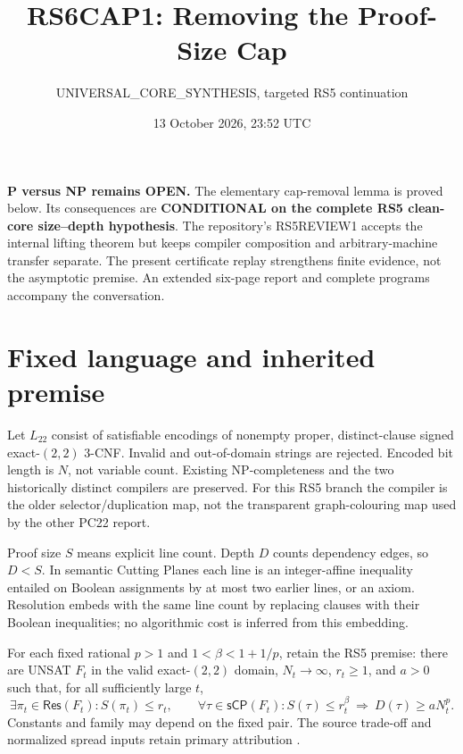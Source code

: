 \documentclass[11pt]{article}
\title{RS6CAP1: Removing the Proof-Size Cap}
\author{UNIVERSAL\_CORE\_SYNTHESIS, targeted RS5 continuation}
\date{13 October 2026, 23:52 UTC}
\newcommand{\sCP}{\mathsf{sCP}}
\begin{document}
\maketitle
\noindent\textbf{P versus NP remains OPEN.}
The elementary cap-removal lemma is proved below. Its consequences are
\textbf{CONDITIONAL on the complete RS5 clean-core size--depth hypothesis}.
The repository's RS5REVIEW1 accepts the internal lifting theorem but keeps
compiler composition and arbitrary-machine transfer separate. The present
certificate replay strengthens finite evidence, not the asymptotic premise.
An extended six-page report and complete programs accompany the conversation.

\section{Fixed language and inherited premise}
Let $L_{22}$ consist of satisfiable encodings of nonempty proper,
distinct-clause signed exact-$(2,2)$ 3-CNF. Invalid and out-of-domain strings
are rejected. Encoded bit length is $N$, not variable count. Existing
NP-completeness and the two historically distinct compilers are preserved.
For this RS5 branch the compiler is the older selector/duplication map,
not the transparent graph-colouring map used by the other PC22 report.

Proof size $S$ means explicit line count. Depth $D$ counts dependency edges,
so $D<S$. In semantic Cutting Planes each line is an integer-affine inequality
entailed on Boolean assignments by at most two earlier lines, or an axiom.
Resolution embeds with the same line count by replacing clauses with their
Boolean inequalities; no algorithmic cost is inferred from this embedding.

For each fixed rational $p>1$ and $1<\beta<1+1/p$, retain the RS5 premise:
there are UNSAT $F_t$ in the valid exact-$(2,2)$ domain, $N_t\to\infty$, $r_t\ge1$,
and $a>0$ such that, for all sufficiently large $t$,
\[
 \exists\pi_t\in\mathsf{Res}(F_t): S(\pi_t)\le r_t,
 \qquad
 \forall\tau\in\sCP(F_t):
 S(\tau)\le r_t^\beta\ \Longrightarrow\ D(\tau)\ge aN_t^p.       \tag{H}
\]
Constants and family may depend on the fixed pair. The source trade-off
and normalized spread inputs retain primary attribution \cite{tradeoff,spread}.
\end{document}
